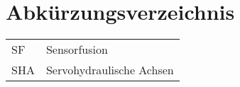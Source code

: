\chapter{Abkürzungsverzeichnis}

\begin{tabular}{ll}
SF & Sensorfusion\\
SHA & Servohydraulische Achsen\\
\end{tabular} 